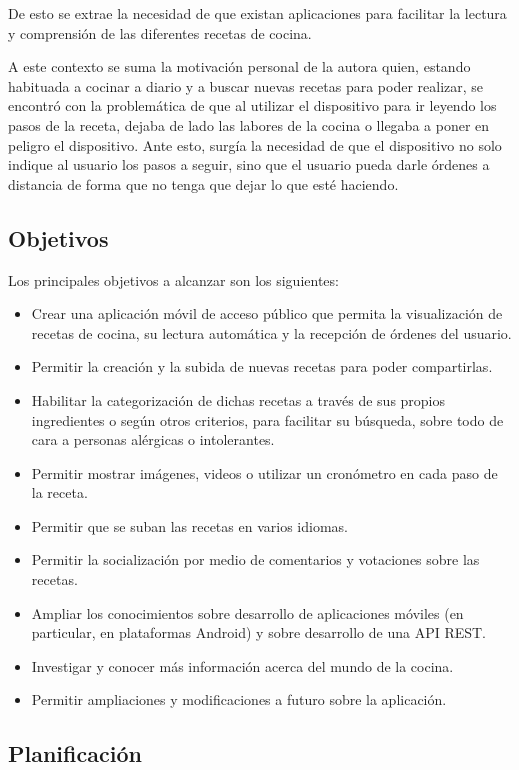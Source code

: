 \documentclass[a4paper,12pt]{article}
\begin{document}
De esto se extrae la necesidad de que existan aplicaciones para facilitar la
lectura y comprensión de las diferentes recetas de cocina.

A este contexto se suma la motivación personal de la autora quien, estando
habituada a cocinar a diario y a buscar nuevas recetas para poder realizar, se
encontró con la problemática de que al utilizar el dispositivo para ir
leyendo los pasos de la receta, dejaba de lado las labores de la cocina
o llegaba a poner en peligro el dispositivo. Ante esto, surgía la necesidad de
que el dispositivo no solo indique al usuario los pasos a seguir, sino que el
usuario pueda darle órdenes a distancia de forma que no tenga que dejar lo que
esté haciendo.


\subsection{Objetivos}

Los principales objetivos a alcanzar son los siguientes:

\begin{itemize}
\item Crear una aplicación móvil de acceso público que permita la visualización
  de recetas de cocina, su lectura automática y la recepción de órdenes del
  usuario.
\item Permitir la creación y la subida de nuevas recetas para poder compartirlas.
\item Habilitar la categorización de dichas recetas a través de sus propios
  ingredientes o según otros criterios, para facilitar su búsqueda, sobre todo
  de cara a personas alérgicas o intolerantes.
\item Permitir mostrar imágenes, videos o utilizar un cronómetro en cada paso
  de la receta.
\item Permitir que se suban las recetas en varios idiomas.
\item Permitir la socialización por medio de comentarios y votaciones sobre las
  recetas.
\item Ampliar los conocimientos sobre desarrollo de aplicaciones móviles (en
  particular, en plataformas Android) y sobre desarrollo de una API REST.
\item Investigar y conocer más información acerca del mundo de la cocina.
\item Permitir ampliaciones y modificaciones a futuro sobre la aplicación.
\end{itemize}


\subsection{Planificación}
\end{document}
